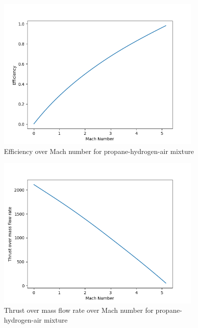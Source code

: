 \documentclass[a4paper,11pt]{article}
\begin{document}
	\begin{figure}[H]
		\centering
		\includegraphics[width=0.9\textwidth]{Propan(1mol)_wodor(0.1mol)_pow/Efficiency_over_Mach.png}
       		\caption{Efficiency over Mach number for propane-hydrogen-air mixture}
	\end{figure}
	\begin{figure}[H]
		\centering
		\includegraphics[width=0.9\textwidth]{Propan(1mol)_wodor(0.1mol)_pow/Thrust_over_mass_flow_rate_over_Mach.png}
       		\caption{Thrust over mass flow rate over Mach number for propane-hydrogen-air mixture}
	\end{figure}
\end{document}

